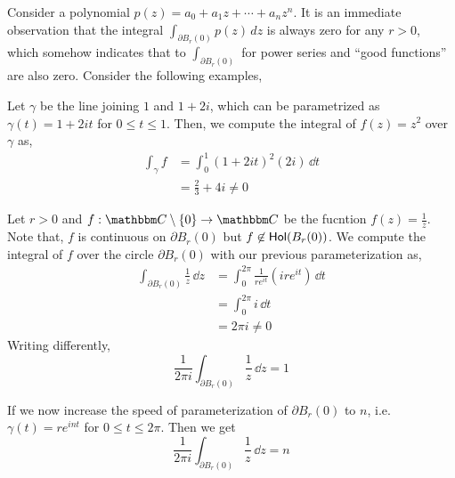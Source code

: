 \documentclass[../ComplexAnalysis_Notes.tex]{subfiles}
\begin{document}
Consider a polynomial \(p(z) = a_0 + a_1 z + \cdots + a_n z^n\). It is an immediate observation that the integral \(\int_{\partial B_r(0)} p(z) \,dz\) is always zero for any \(r > 0\), which somehow indicates that to \(\int_{\partial B_r(0)}\) for power series and ``good functions'' are also zero. Consider the following examples,

\begin{Eg}{}{}
  Let \(\gamma\) be the line joining \(1\) and \(1+2i\), which can be parametrized as \(\gamma(t) = 1 + 2it\) for \(0 \leq t \leq 1\). Then, we compute the integral of \(f(z) = z^2\) over \(\gamma\) as,
  \begin{align*}
    \int_\gamma f
     & = \int_0^1 (1 + 2it)^2 (2i) \, \dd{t} \\
     & = \frac{2}{3} + 4i \neq 0
  \end{align*}
\end{Eg}

\begin{Eg}{}{}
  Let \(r > 0\) and \(f : \C \setminus \{0\} \to \C\) be the fucntion \(f(z) = \frac 1z\). Note that, \(f\) is continuous on \(\partial B_r(0)\) but \(f \not\in \operatorname{\mathsf{Hol}}(B_r(0)) \). We compute the integral of \(f\) over the circle \(\partial B_r(0)\) with our previous parameterization as,
  \begin{align*}
    \int_{\partial B_r(0)} \frac 1z \, \dd{z}
     & = \int_0^{2\pi} \frac{1}{re^{it}} (ire^{it}) \, \dd{t} \\
     & = \int_0^{2\pi} i \, \dd{t}                            \\
     & = 2\pi i \neq 0
  \end{align*}
  Writing differently,
  \[
    \frac 1{2\pi i} \int_{\partial B_r(0)} \frac 1z \, \dd{z} = 1
  \]

  If we now increase the speed of parameterization of \(\partial B_r(0)\) to \(n\), i.e. \(\gamma(t) = re^{int}\) for \(0 \leq t \leq 2\pi\). Then we get
  \[
    \frac 1{2\pi i} \int_{\partial B_r(0)} \frac 1z \, \dd{z} = n
  \]
\end{Eg}
\end{document}
